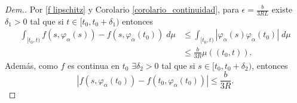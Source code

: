 \begin{proof}[Dem.]
Por \eqref{f lipschitz} y Corolario \ref{corolario_continuidad}, para $\epsilon=\frac{b}{3RL}$ existe $\delta_1>0$ tal que si $t\in[t_0,t_0+\delta_1)$ entonces
\begin{equation}
    \begin{split}
        \int_{[t_0,t)} f(s,\varphi_\alpha(s))-f(s,\varphi_\alpha(t_0))\; d\mu& \leq \int_{[t_0,t)} |\varphi_\alpha(s)\varphi_\alpha(t_0)|\; d\mu \\ &\leq \frac{b}{3R}\mu((t_0,t)).
    \end{split}\label{eq:A}
\end{equation}
Además, como $f$ es continua en $t_0$ $\exists \delta_2>0 $ tal que si $s\in [t_0,t_0+\delta_2)$, entonces
\begin{equation}
    |f(s,\varphi_\alpha(t_0))-f(t_0,\varphi_\alpha(t_0))|\leq \frac{b}{3R}.\label{eq:B}
\end{equation}


\end{proof}
